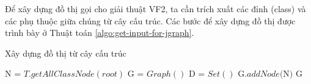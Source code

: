 \documentclass[12pt]{report}
\newenvironment{thuattoan}[1][h]
  {\renewcommand{\algorithmcfname}{Thuật toán}
   \begin{algorithm}[#1]
  }{\end{algorithm}}
\begin{document}
\noindent Để xây dựng đồ thị gọi cho giải thuật VF2, ta cần trích xuất các đỉnh (class) và các phụ thuộc giữa chúng từ cây cấu trúc. Các bước để xây dựng đồ thị được trình bày ở Thuật toán \ref{algo:get-input-for-jgraph}.

\begin{thuattoan}
	\label{algo:get-input-for-jgraph}
	\caption{Xây dựng đồ thị từ cây cấu trúc}
	N = $T.getAllClassNode(root)$\;
	G = $Graph()$\;
	 D = $Set()$\;
	G.$addNode($N$)$\;
	\Return G \;
	
\end{thuattoan}
\end{document}
